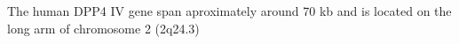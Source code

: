 The human DPP4 IV gene span aproximately around 70 kb and is located on the long arm of chromosome 2 (2q24.3)